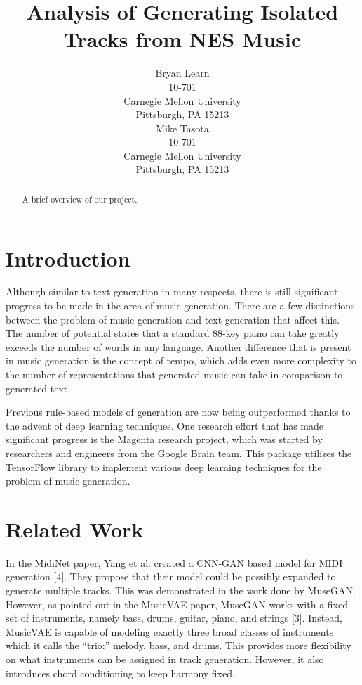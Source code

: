 \documentclass{article}
\title{Analysis of Generating Isolated Tracks from NES Music}
\author{
  Bryan Learn\\
  10-701\\
  Carnegie Mellon University\\
  Pittsburgh, PA 15213\\
  \And
  Mike Tasota\\
  10-701\\
  Carnegie Mellon University\\
  Pittsburgh, PA 15213\\
}
\begin{document}

\maketitle


\begin{abstract}
  A brief overview of our project.
\end{abstract}


\section{Introduction}


Although similar to text generation in many respects, there is still significant progress to be made in the area of music generation. There are a few distinctions between the problem of music generation and text generation that affect this. The number of potential states that a standard 88-key piano can take greatly exceeds the number of words in any language. Another difference that is present in music generation is the concept of tempo, which adds even more complexity to the number of representations that generated music can take in comparison to generated text.

Previous rule-based models of generation are now being outperformed thanks to the advent of deep learning techniques. One research effort that has made significant progress is the Magenta research project, which was started by researchers and engineers from the Google Brain team. This package utilizes the TensorFlow library to implement various deep learning techniques for the problem of music generation.


\section{Related Work}


In the MidiNet paper, Yang et al. created a CNN-GAN based model for MIDI generation [4]. They propose that their model could be possibly expanded to generate multiple tracks. This was demonstrated in the work done by MuseGAN. However, as pointed out in the MusicVAE paper, MuseGAN works with a fixed set of instruments, namely bass, drums, guitar, piano, and strings [3]. Instead, MusicVAE is capable of modeling exactly three broad classes of instruments which it calls the “trio:” melody, bass, and drums. This provides more flexibility on what instruments can be assigned in track generation. However, it also introduces chord conditioning to keep harmony fixed.
\end{document}
